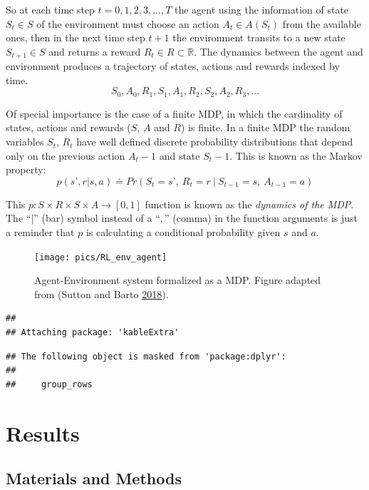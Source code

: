 \documentclass[
]{book}
\begin{document}
So at each time step \(t=0,1,2,3,...,T\) the agent using the information of state \(S_t \in S\) of the environment must choose an action \(A_t \in A(S_t)\) from the available ones, then in the next time step \(t+1\) the environment transits to a new state \(S_{t+1} \in S\) and returns a reward \(R_t \in R \subset \mathds{R}\). The dynamics between the agent and environment produces a trajectory of states, actions and rewards indexed by time.
\[ S_0, A_0, R_1, S_1, A_1, R_2, S_2, A_2, R_3, ...\]

Of special importance is the case of a finite MDP, in which the cardinality of states, actions and rewards (\(S\), \(A\) and \(R\)) is finite. In a finite MDP the random variables \(S_t\), \(R_t\) have well defined discrete probability distributions that depend only on the previous action \(A_t-1\) and state \(S_t-1\). This is known as the Markov property:
\[ p(s’, r | s, a) \doteq Pr(S_t=s’,\ R_t=r\ |\ S_{t-1}=s,\ A_{t-1}=a) \]

This \(p: S \times R \times S \times A \rightarrow [0,1]\) function is known as the \emph{dynamics of the MDP}. The ``\(|\)'' (bar) symbol instead of a ``\(,\)'' (comma) in the function arguments is just a reminder that \(p\) is calculating a conditional probability given \(s\) and \(a\).



\begin{figure}

{\centering \texttt{[image: pics/RL\_env\_agent]} 

}

\caption{Agent-Environment system formalized as a MDP. Figure adapted from (Sutton and Barto \protect\hyperlink{ref-sutton2018reinforcement}{2018}).}\label{fig:env-agent-interactions}
\end{figure}

\begin{verbatim}
## 
## Attaching package: 'kableExtra'
\end{verbatim}

\begin{verbatim}
## The following object is masked from 'package:dplyr':
## 
##     group_rows
\end{verbatim}

\hypertarget{results}{%
\chapter{Results}\label{results}}

\hypertarget{materials-and-methods}{%
\section{Materials and Methods}\label{materials-and-methods}}
\end{document}
